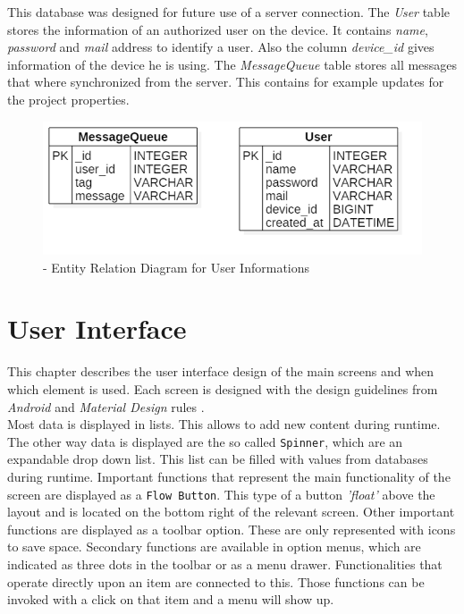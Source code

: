 This database was designed for future use of a server connection. The \textit{User} table stores the information of an authorized user on the device. It contains \textit{name}, \textit{password} and \textit{mail} address to identify a user. Also the column \textit{device\_id} gives information of the device he is using. The \textit{MessageQueue} table stores all messages that where synchronized from the server. This contains for example updates for the project properties.
\begin{figure}[h] 
	\centering 
	\includegraphics[width=14cm]{images/userDBDiagramm.png} 
	\caption{- Entity Relation Diagram  for User Informations} 
	\label{fig:userER}
\end{figure}

\section{User Interface}

This chapter describes the user interface design of the main screens and when which element is used. Each screen is designed with the design guidelines from \textit{Android} and \textit{Material Design} rules \cite{materialdesign}. \\
Most data is displayed in lists. This allows to add new content during runtime. The other way data is displayed are the so called \texttt{Spinner}, which are an expandable drop down list. This list can be filled with values from databases during runtime. Important functions that represent the main functionality of the screen are displayed as a \texttt{Flow Button}. This type of a button \textit{'float'} above the layout and is located on the bottom right of the relevant screen. Other important functions are displayed as a toolbar option. These are only represented with icons to save space. Secondary functions are available in option menus, which are indicated as three dots in the toolbar or as a menu drawer. Functionalities that operate directly upon an item are connected to this. Those functions can be invoked with a click on that item and a menu will show up. 

